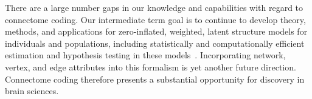 \documentclass[11pt]{article}
\begin{document}
There are a  large number gaps in our knowledge and capabilities with regard to connectome coding.  Our intermediate term goal is to continue to develop theory, methods, and applications for zero-inflated, weighted, latent structure models for individuals and populations, including statistically and computationally efficient estimation and hypothesis testing in these models~\cite{Tang2017-jm}. Incorporating network, vertex, and edge attributes into this formalism is yet another future direction. 
Connectome coding therefore presents a substantial opportunity for discovery in brain sciences.

%




 
\end{document}
